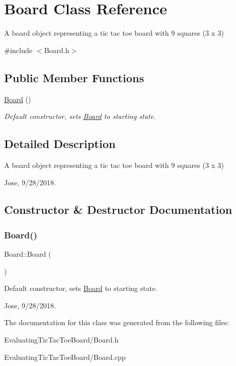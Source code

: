 \hypertarget{class_board}{}\section{Board Class Reference}
\label{class_board}


A board object representing a tic tac toe board with 9 squares (3 x 3)  




{\ttfamily \#include $<$Board.\+h$>$}

\subsection*{Public Member Functions}
\begin{DoxyCompactItemize}
\item 
\mbox{\hyperlink{class_board_a9ee491d4fea680cf69b033374a9fdfcb}{Board}} ()
\begin{DoxyCompactList}\small\item\em Default constructor, sets \mbox{\hyperlink{class_board}{Board}} to starting state. \end{DoxyCompactList}\end{DoxyCompactItemize}


\subsection{Detailed Description}
A board object representing a tic tac toe board with 9 squares (3 x 3) 

Jose, 9/28/2018. 

\subsection{Constructor \& Destructor Documentation}
\mbox{\label{class_board_a9ee491d4fea680cf69b033374a9fdfcb}} 
\subsubsection{\texorpdfstring{Board()}{Board()}}
{\footnotesize\ttfamily Board\+::\+Board (\begin{DoxyParamCaption}{ }\end{DoxyParamCaption})}



Default constructor, sets \mbox{\hyperlink{class_board}{Board}} to starting state. 

Jose, 9/28/2018. 

The documentation for this class was generated from the following files\+:\begin{DoxyCompactItemize}
\item 
Evaluating\+Tic\+Tac\+Toe\+Board/Board.\+h\item 
Evaluating\+Tic\+Tac\+Toe\+Board/Board.\+cpp\end{DoxyCompactItemize}
